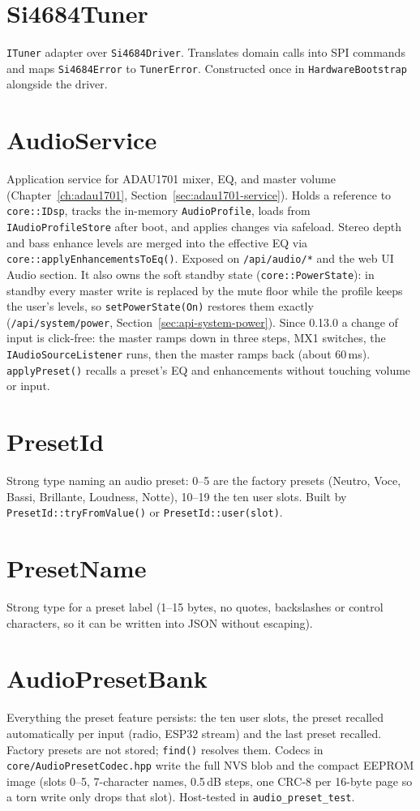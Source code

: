 \section{Si4684Tuner}\label{cls:Si4684Tuner}
\texttt{ITuner} adapter over \texttt{Si4684Driver}. Translates domain calls
into SPI commands and maps \texttt{Si4684Error} to \texttt{TunerError}.
Constructed once in \texttt{HardwareBootstrap} alongside the driver.

\section{AudioService}\label{cls:AudioService}
Application service for ADAU1701 mixer, EQ, and master volume
(Chapter~\ref{ch:adau1701}, Section~\ref{sec:adau1701-service}). Holds a
reference to \texttt{core::IDsp}, tracks the in-memory \texttt{AudioProfile},
loads from \texttt{IAudioProfileStore} after boot, and applies changes via
safeload. Stereo depth and bass enhance levels are merged into the effective
EQ via \texttt{core::applyEnhancementsToEq()}. Exposed on
\texttt{/api/audio/*} and the web UI Audio section.
It also owns the soft standby state (\texttt{core::PowerState}): in
standby every master write is replaced by the mute floor while the
profile keeps the user's levels, so \texttt{setPowerState(On)} restores
them exactly (\texttt{/api/system/power},
Section~\ref{sec:api-system-power}).
Since 0.13.0 a change of input is click-free: the master ramps down in
three steps, MX1 switches, the \texttt{IAudioSourceListener} runs, then
the master ramps back (about 60\,ms). \texttt{applyPreset()} recalls a
preset's EQ and enhancements without touching volume or input.

\section{PresetId}\label{cls:PresetId}
Strong type naming an audio preset: 0--5 are the factory presets
(Neutro, Voce, Bassi, Brillante, Loudness, Notte), 10--19 the ten user
slots. Built by \texttt{PresetId::tryFromValue()} or
\texttt{PresetId::user(slot)}.

\section{PresetName}\label{cls:PresetName}
Strong type for a preset label (1--15 bytes, no quotes, backslashes or
control characters, so it can be written into JSON without escaping).

\section{AudioPresetBank}\label{cls:AudioPresetBank}
Everything the preset feature persists: the ten user slots, the preset
recalled automatically per input (radio, ESP32 stream) and the last preset
recalled. Factory presets are not stored; \texttt{find()} resolves them.
Codecs in \texttt{core/AudioPresetCodec.hpp} write the full NVS blob and the
compact EEPROM image (slots 0--5, 7-character names, 0.5\,dB steps, one
CRC-8 per 16-byte page so a torn write only drops that slot).
Host-tested in \texttt{audio\_preset\_test}.

